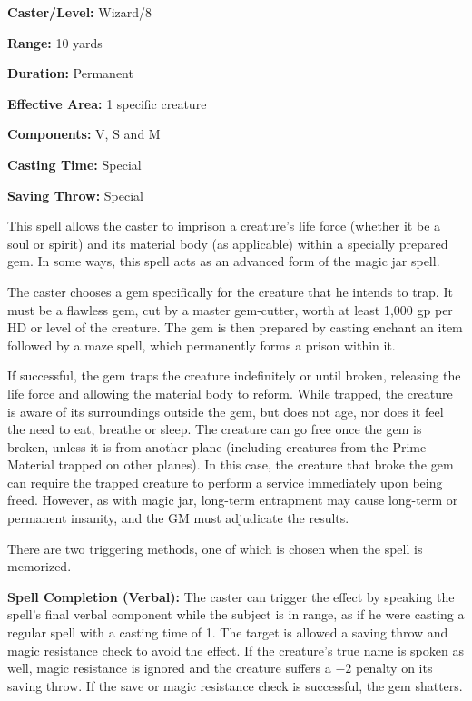 \begin{multicols}{2}
\begin{minipage}{\columnwidth}
\noindent \textbf{Caster/Level:} Wizard/8

\noindent \textbf{Range:} 10 yards

\noindent \textbf{Duration:} Permanent

\noindent \textbf{Effective Area:} 1 specific creature

\noindent \textbf{Components:} V, S and M

\noindent \textbf{Casting Time:} Special

\noindent \textbf{Saving Throw:} Special

\end{minipage}

This spell allows the caster to imprison a creature's life force (whether it be a soul or spirit) and its material body (as applicable) within a specially prepared gem.  In some ways, this spell acts as an advanced form of the magic jar spell.

The caster chooses a gem specifically for the creature that he intends to trap.  It must be a flawless gem, cut by a master gem-cutter, worth at least 1,000 gp per HD or level of the creature.  The gem is then prepared by casting enchant an item followed by a maze spell, which permanently forms a prison within it.  

If successful, the gem traps the creature indefinitely or until broken, releasing the life force and allowing the material body to reform.  While trapped, the creature is aware of its surroundings outside the gem, but does not age, nor does it feel the need to eat, breathe or sleep.  The creature can go free once the gem is broken, unless it is from another plane (including creatures from the Prime Material trapped on other planes).  In this case, the creature that broke the gem can require the trapped creature to perform a service immediately upon being freed.  However, as with magic jar, long-term entrapment may cause long-term or permanent insanity, and the GM must adjudicate the results.

There are two triggering methods, one of which is chosen when the spell is memorized. 

\textbf{Spell Completion (Verbal):} The caster can trigger the effect by speaking the spell's final verbal component while the subject is in range, as if he were casting a regular spell with a casting time of 1.  The target is allowed a saving throw and magic resistance check to avoid the effect.  If the creature's true name is spoken as well, magic resistance is ignored and the creature suffers a $-2$ penalty on its saving throw.  If the save or magic resistance check is successful, the gem shatters. 


\end{multicols}
